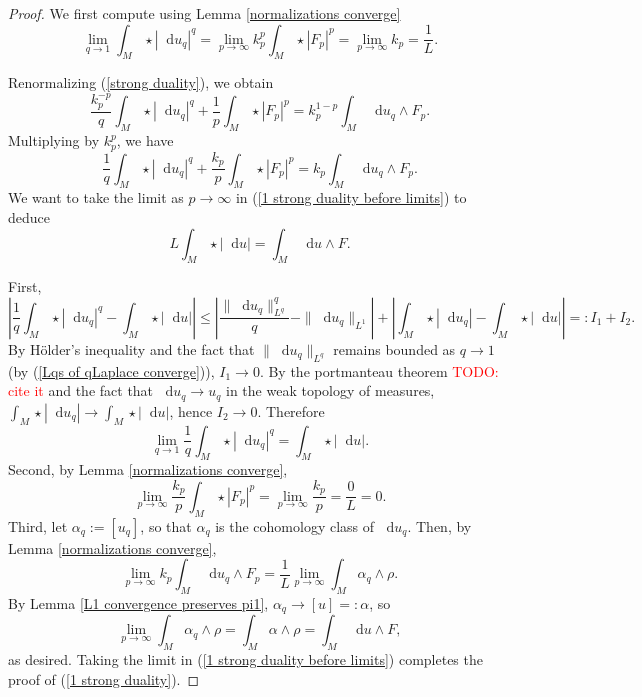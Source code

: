 \documentclass[reqno,11pt]{amsart}
\newcommand*\dif{\mathop{}\!\mathrm{d}}
\theoremstyle{definition}
\numberwithin{equation}{section}
\newcommand\todo[1]{\textcolor{red}{TODO: #1}}
\begin{document}
\begin{proof}
We first compute using Lemma \ref{normalizations converge}
\begin{equation}\label{Lqs of qLaplace converge}
\lim_{q \to 1} \int_M \star |\dif u_q|^q = \lim_{p \to \infty} k_p^p \int_M \star |F_p|^p = \lim_{p \to \infty} k_p = \frac{1}{L}.
\end{equation}

Renormalizing (\ref{strong duality}), we obtain 
$$\frac{k_p^{-p}}{q} \int_M \star |\dif u_q|^q + \frac{1}{p} \int_M \star |F_p|^p = k_p^{1 - p} \int_M \dif u_q \wedge F_p.$$
Multiplying by $k_p^p$, we have 
\begin{equation}\label{1 strong duality before limits}
	\frac{1}{q} \int_M \star |\dif u_q|^q + \frac{k_p}{p} \int_M \star |F_p|^p = k_p \int_M \dif u_q \wedge F_p.
\end{equation}
We want to take the limit as $p \to \infty$ in (\ref{1 strong duality before limits}) to deduce
\begin{equation}\label{1 strong duality}
	L \int_M \star |\dif u| = \int_M \dif u \wedge F.
\end{equation}

First,
$$\left|\frac{1}{q} \int_M \star |\dif u_q|^q - \int_M \star |\dif u|\right| \leq \left|\frac{\|\dif u_q\|_{L^q}^q}{q} - \|\dif u_q\|_{L^1}\right| + \left|\int_M \star |\dif u_q| - \int_M \star |\dif u|\right| =: I_1 + I_2.$$
By H\"older's inequality and the fact that $\|\dif u_q\|_{L^q}$ remains bounded as $q \to 1$ (by (\ref{Lqs of qLaplace converge})), $I_1 \to 0$.
By the portmanteau theorem \todo{cite it} and the fact that $\dif u_q \to u_q$ in the weak topology of measures, $\int_M \star |\dif u_q| \to \int_M \star |\dif u|$, hence $I_2 \to 0$.
Therefore 
$$\lim_{q \to 1} \frac{1}{q} \int_M \star |\dif u_q|^q = \int_M \star |\dif u|.$$
Second, by Lemma \ref{normalizations converge},
$$\lim_{p \to \infty} \frac{k_p}{p} \int_M \star |F_p|^p = \lim_{p \to \infty} \frac{k_p}{p} = \frac{0}{L} = 0.$$
Third, let $\alpha_q := [u_q]$, so that $\alpha_q$ is the cohomology class of $\dif u_q$.
Then, by Lemma \ref{normalizations converge},
$$\lim_{p \to \infty} k_p \int_M \dif u_q \wedge F_p = \frac{1}{L} \lim_{p \to \infty} \int_M \alpha_q \wedge \rho.$$
By Lemma \ref{L1 convergence preserves pi1}, $\alpha_q \to [u] =: \alpha$, so 
$$\lim_{p \to \infty} \int_M \alpha_q \wedge \rho = \int_M \alpha \wedge \rho = \int_M \dif u \wedge F,$$
as desired.
Taking the limit in (\ref{1 strong duality before limits}) completes the proof of (\ref{1 strong duality}).


\end{proof}
\end{document}
